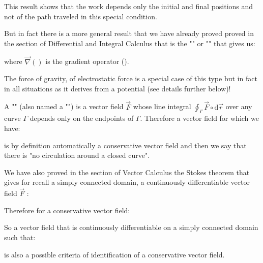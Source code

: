 	This result shows that the work depends only the initial and final positions and not of the path traveled in this special condition. 
	
	But in fact there is a more general result that we have already proved proved in the section of Differential and Integral Calculus that is the "" or "" that gives us:
	
	where $\vec{\nabla}()$ is the gradient operator ().
	
	The force of gravity, of electrostatic force is a special case of this type but in fact in all situations as it derives from a potential (see details further below)!
	
	A "" (also named a "") is a vector field $\vec{F}$ whose line integral $\oint_\Gamma \vec{F}\circ\mathrm{d}\vec{r}$ over any curve $\Gamma$ depends only on the endpoints of $\Gamma$. Therefore a vector field for which we have:
	
	is by definition automatically a conservative vector field and then we say that there is "no circulation around a closed curve".
	
	We have also proved in the section of Vector Calculus the Stokes theorem that gives for recall a simply connected domain, a continuously differentiable vector field $\vec{F}$ :
	
	Therefore for a conservative vector field:
	
	So a vector field that is continuously differentiable on a simply connected domain such that:
	
	is also a possible criteria of identification of a conservative vector field.
	
